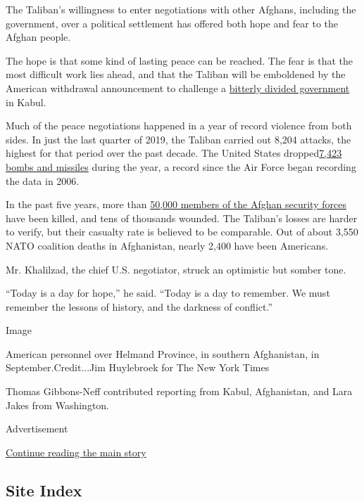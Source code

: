 The Taliban's willingness to enter negotiations with other Afghans,
including the government, over a political settlement has offered both
hope and fear to the Afghan people.

The hope is that some kind of lasting peace can be reached. The fear is
that the most difficult work lies ahead, and that the Taliban will be
emboldened by the American withdrawal announcement to challenge a
\href{https://www.nytimes.com/2020/02/18/world/asia/afghanistan-election-ashraf-ghani.html}{bitterly
divided government} in Kabul.

Much of the peace negotiations happened in a year of record violence
from both sides. In just the last quarter of 2019, the Taliban carried
out 8,204 attacks, the highest for that period over the past decade. The
United States
dropped\href{https://www.nytimes.com/2020/01/31/world/asia/afghanistan-violence-taliban.html}{7,423
bombs and missiles} during the year, a record since the Air Force began
recording the data in 2006.

In the past five years, more than
\href{https://www.nytimes.com/2018/09/21/world/asia/afghanistan-security-casualties-taliban.html}{50,000
members of the Afghan security forces} have been killed, and tens of
thousands wounded. The Taliban's losses are harder to verify, but their
casualty rate is believed to be comparable. Out of about 3,550 NATO
coalition deaths in Afghanistan, nearly 2,400 have been Americans.

Mr. Khalilzad, the chief U.S. negotiator, struck an optimistic but
somber tone.

``Today is a day for hope,'' he said. ``Today is a day to remember. We
must remember the lessons of history, and the darkness of conflict.''

Image

American personnel over Helmand Province, in southern Afghanistan, in
September.Credit...Jim Huylebroek for The New York Times

Thomas Gibbons-Neff contributed reporting from Kabul, Afghanistan, and
Lara Jakes from Washington.

Advertisement

\protect\hyperlink{after-bottom}{Continue reading the main story}

\hypertarget{site-index}{%
\subsection{Site Index}\label{site-index}}

